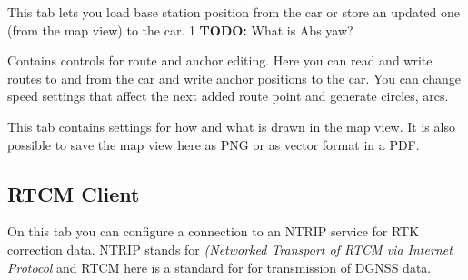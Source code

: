 \documentclass[12pt]{article} %
\def\printtodos{0}
\newcommand{\todo}[1]{
  \if\printtodos1
      {\color{red} \textbf{TODO:} #1}
  \fi}
\begin{document}
\vspace{5mm}

 This tab lets you load base station position from the car or
store an updated one (from the map view) to the car. \todo{What is Abs
  yaw?}

 Contains controls for route and anchor editing. Here
you can read and write routes to and from the car and write anchor
positions to the car.  You can change speed settings that affect the
next added route point and generate circles, arcs.


 This tab contains settings for how and what is drawn
in the map view.  It is also possible to save the map view here as PNG
or as vector format in a PDF.


  
\subsection{RTCM Client}\label{sec:RTCM}

On this tab you can configure a connection to an NTRIP service for RTK correction data.
  NTRIP stands for {\em (Networked Transport of RTCM via Internet Protocol} and RTCM here is
  a standard for for transmission of DGNSS data.
  
\end{document}

